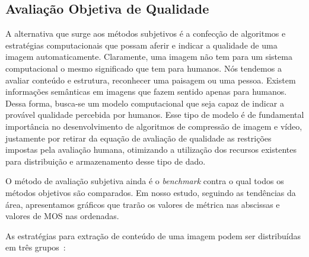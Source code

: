 
\subsection{Avaliação Objetiva de Qualidade}

A alternativa que surge aos métodos subjetivos é a confecção de algoritmos e estratégias computacionais que possam aferir e indicar a qualidade de uma imagem automaticamente. Claramente, uma imagem não tem para um sistema computacional o mesmo significado que tem para humanos. Nós tendemos a avaliar conteúdo e estrutura, reconhecer uma paisagem ou uma pessoa. Existem informações semânticas em imagens que fazem sentido apenas para humanos. Dessa forma, busca-se um modelo computacional que seja capaz de indicar a provável qualidade percebida por humanos. Esse tipo de modelo é de fundamental importância no desenvolvimento de algoritmos de compressão de imagem e vídeo, justamente por retirar da equação de avaliação de qualidade as restrições impostas pela avaliação humana, otimizando a utilização dos recursos existentes para distribuição e armazenamento desse tipo de dado.

O método de avaliação subjetiva ainda é o \emph{benchmark} contra o qual todos os métodos objetivos são comparados. Em nosso estudo, seguindo as tendências da área, apresentamos gráficos que trarão os valores de métrica nas abscissas e valores de MOS nas ordenadas.

As estratégias para extração de conteúdo de uma imagem podem ser distribuídas em três grupos~\cite{Winkler-2005-Wiley}:

